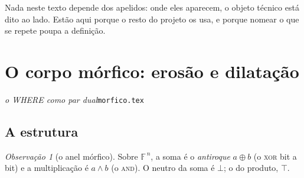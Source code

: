 \documentclass[11pt]{article}
\newcommand{\code}[1]{\texttt{\small #1}}
\theoremstyle{plain}
\theoremstyle{remark}
\providecommand{\FF}{\ensuremath{\mathbb{F}}}
\providecommand{\GG}{\ensuremath{\mathbb{G}}}
\providecommand{\ZZ}{\ensuremath{\mathbb{Z}}}
\newtheorem{definicao}[teorema]{Observação}
\begin{document}
\noindent Nada neste texto depende dos apelidos: onde eles aparecem, o objeto técnico está dito ao
lado. Estão aqui porque o resto do projeto os usa, e porque nomear o que se repete poupa a
definição.



\section{O corpo mórfico: erosão e dilatação}

\noindent\emph{o WHERE como par dual}\hfill\code{morfico.tex}




\begin{abstract}
A estrutura mórfica é $(\FF^{\,n},\oplus,\wedge)$: o \emph{antiroque} $\oplus$ como soma, a \emph{erosão} como
multiplicação. Ela é um anel booleano --- todo elemento é idempotente ---, e portanto corpo se e somente se
$n=1$, onde é $\FF$. Para $n>1$ há divisores de zero, e a razão é estrutural: $a\wedge a=a$ deixa o inverso sem
lugar.

\noindent Em $\GG=\ZZ/2$ a unidade vale $\ell=2$, logo a metade é $\ell/2=1$, e a deflexão por ela é
\[
D_1(x)=x+1=x\oplus1=\neg x.
\]
\textbf{O antiroque é a deflexão pela metade}, e é a única deflexão involutiva de $\ZZ/2$. \emph{Não é, porém, a
reflexão}: em característica $2$ vale $-1\equiv+1$, e o endomorfismo $\nu=-1$ colapsa na identidade. A reflexão
do contrato desaparece; a involução que sobra --- a complementação --- não é endomorfismo, pois $\neg0=1\neq0$.
Aqui as duas separam-se, e essa separação é o conteúdo do capítulo.

\noindent Do lado dos operadores, a adjunção $\delta\dashv\varepsilon$ dá $\delta\varepsilon\delta=\delta$ e
$\varepsilon\delta\varepsilon=\varepsilon$, donde $\varphi=\varepsilon\delta$ e $\gamma=\delta\varepsilon$
idempotentes. E a erosão preserva a \emph{multiplicação} ($\wedge$), enquanto a dilatação preserva a soma
reticular ($\vee$): cada operador guarda uma das operações, e a complementação troca-os.
\end{abstract}

\subsection{A estrutura}

\begin{definicao}[o anel mórfico]\label{def:morfico}
Sobre $\FF^{\,n}$, a soma é o \emph{antiroque} $a\oplus b$ (o \textsc{xor} bit a bit) e a multiplicação é
$a\wedge b$ (o \textsc{and}). O neutro da soma é $\bot$; o do produto, $\top$.
\end{definicao}
\end{document}
